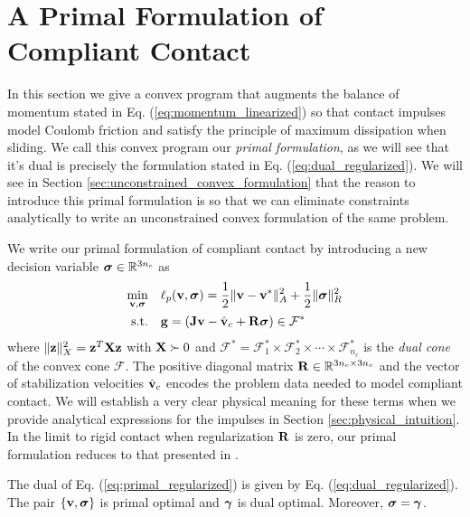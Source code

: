 
\section{A Primal Formulation of Compliant Contact}
\label{sec:primal_formulation}

In this section we give a convex program that augments the balance of momentum
stated in Eq. (\ref{eq:momentum_linearized}) so that contact impulses model
Coulomb friction and satisfy the principle of maximum dissipation when sliding.
We call this convex program our \emph{primal formulation}, as we will see that
it's dual is precisely the formulation stated in Eq.
(\ref{eq:dual_regularized}). We will see in Section
\ref{sec:unconstrained_convex_formulation} that the reason to introduce this
primal formulation is so that we can eliminate constraints analytically to write
an unconstrained convex formulation of the same problem.

We write our primal formulation of compliant contact by introducing a new
decision variable ${\bm{\sigma}}\in\mathbb{R}^{3n_c}$ as
\begin{equation}
	\begin{aligned}
	\min_{\mf{v},\bsigma} \quad & \ell_p(\mf{v},\bsigma) =
	\frac{1}{2}\Vert\mf{v}-\mf{v}^*\Vert_{A}^2 +
	\frac{1}{2} \Vert\bsigma\Vert_{R}^2\\
	\textrm{s.t.} \quad & \mf{g} = (\mf{J}\mf{v}-\hat{\mf{v}}_c + \mf{R}\bsigma) \in \mathcal{F}^*\\
	\end{aligned}
	\label{eq:primal_regularized}
\end{equation}
where $\Vert{\mathbf{z}}\Vert_X^2={\mathbf{z}}^T{\mathbf{X}}{\mathbf{z}}$ with ${\mathbf{X}}\succ 0$ and
$\mathcal{F^*}= \mathcal{F}^*_1 \times \mathcal{F}^*_2 \times \cdots \times
\mathcal{F}^*_{n_c}$ is the \emph{dual cone} of the convex cone $\mathcal{F}$.
The positive diagonal matrix ${\mathbf{R}}\in\mathbb{R}^{3n_c\times 3n_c}$ and the
vector of stabilization velocities $\hat{{\mathbf{v}}}_c$ encodes the problem data
needed to model compliant contact. We will establish a very clear physical
meaning for these terms when we provide analytical expressions for the impulses
in Section \ref{sec:physical_intuition}. In the limit to rigid contact
when regularization ${\mathbf{R}}$ is zero, our primal formulation reduces to that
presented in \cite{bib:mazhar2014}.

\begin{theorem}
The dual of Eq. (\ref{eq:primal_regularized}) is given by Eq.
(\ref{eq:dual_regularized}). The pair $\{{\mathbf{v}},{\bm\sigma}\}$ is primal optimal and
${\bm\gamma}$ is dual optimal. Moreover, ${\bm\sigma} = {\bm\gamma}$.
\end{theorem}

